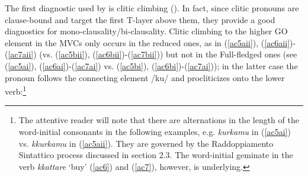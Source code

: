 \documentclass[output=paper]{langscibook}
\begin{document}
 The first diagnostic used by \cite{cardinaletti2003a} is clitic climbing (\cite{rizzi1976a}). In fact, since clitic pronouns are clause-bound and target the first T-layer above them, they provide a good diagnostics for mono-clausality/bi-clausality. Clitic climbing to the higher GO element in the MVCs only occurs in the reduced ones, as in (\ref{ac5aii}), (\ref{ac6aii})-(\ref{ac7aii}) (vs. (\ref{ac5bii}), (\ref{ac6bii})-(\ref{ac7bii})) but not in the Full-fledged ones (see (\ref{ac5ai}), (\ref{ac6ai})-(\ref{ac7ai}) vs. (\ref{ac5bi}), (\ref{ac6bi})-(\ref{ac7ai})); in the latter case the pronoun follows the connecting element /ku/ and procliticizes onto the lower verb:\footnote{The attentive reader will note that there are alternations in the length of the word-initial consonants in the following examples, e.g. \textit{kurkamu} in (\ref{ac5ai}) vs. \textit{kkurkamu} in (\ref{ac5aii}).  They are governed by the Raddoppiamento Sintattico process discussed in section 2.3.  The word-initial geminate in the verb \textit{kkattare} ‘buy’ (\ref{ac6}) and (\ref{ac7}), however, is underlying.} 
\end{document}
